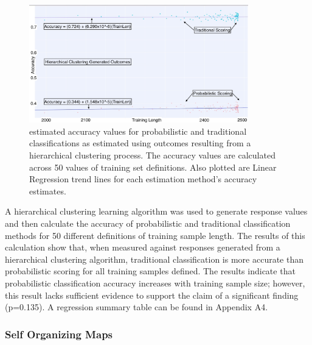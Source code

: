 \documentclass[12pt,]{article}
\begin{document}
\begin{figure}[h!]
\begin{center}
\includegraphics[width=0.85\textwidth]{HCResultsGraph.jpeg}
\end{center}
\caption[Hierarchical Clustering Result Plot]{estimated accuracy values for probabilistic and traditional classifications as estimated using outcomes resulting from a hierarchical clustering process.  The accuracy values are calculated across 50 values of training set definitions.  Also plotted are Linear Regression trend lines for each estimation method's accuracy estimates.}
\end{figure}

A hierarchical clustering learning algorithm was used to generate
response values and then calculate the accuracy of probabilistic and
traditional classification methods for 50 different definitions of
training sample length. The results of this calculation show that, when
measured against responses generated from a hierarchical clustering
algorithm, traditional classification is more accurate than
probabilistic scoring for all training samples defined. The results
indicate that probabilistic classification accuracy increases with
training sample size; however, this result lacks sufficient evidence to
support the claim of a significant finding (p=0.135). A regression
summary table can be found in Appendix A4.

\hypertarget{self-organizing-maps-1}{%
\subsubsection{Self Organizing Maps}\label{self-organizing-maps-1}}
\end{document}

